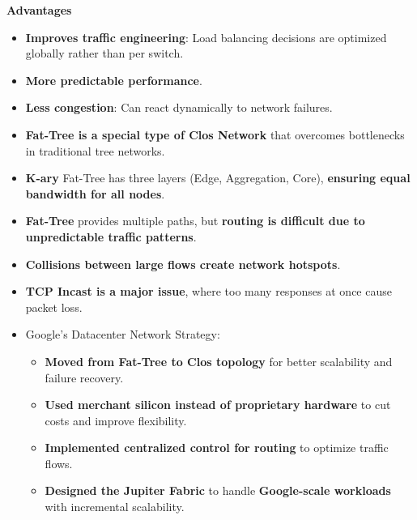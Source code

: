 \begin{itemize}[label=\textcolor{Green3}{}]
    \textcolor{Green3}{ \textbf{Advantages}}
    \begin{itemize}[label=\textcolor{Green3}{}]
        \item \textcolor{Green3}{\textbf{Improves traffic engineering}}: Load balancing decisions are optimized globally rather than per switch.
        \item \textcolor{Green3}{\textbf{More predictable performance}}.
        \item \textcolor{Green3}{\textbf{Less congestion}}: Can react dynamically to network failures.
    \end{itemize}
\end{itemize}

\begin{takeawaysbox}
    \begin{itemize}
        \item \textbf{Fat-Tree is a special type of Clos Network} that overcomes bottlenecks in traditional tree networks.  
        \item \textbf{K-ary} Fat-Tree has three layers (Edge, Aggregation, Core), \textbf{ensuring equal bandwidth for all nodes}.  
        \item \textbf{Fat-Tree} provides multiple paths, but \textbf{routing is difficult due to unpredictable traffic patterns}.  
        \item \textbf{Collisions between large flows create network hotspots}.  
        \item \textbf{TCP Incast is a major issue}, where too many responses at once cause packet loss.
        \item Google's Datacenter Network Strategy:
        \begin{itemize}
            \item \textbf{Moved from Fat-Tree to Clos topology} for better scalability and failure recovery.
            \item \textbf{Used merchant silicon instead of proprietary hardware} to cut costs and improve flexibility.
            \item \textbf{Implemented centralized control for routing} to optimize traffic flows.
            \item \textbf{Designed the Jupiter Fabric} to handle \textbf{Google-scale workloads} with incremental scalability.
        \end{itemize}
    \end{itemize}
\end{takeawaysbox}
